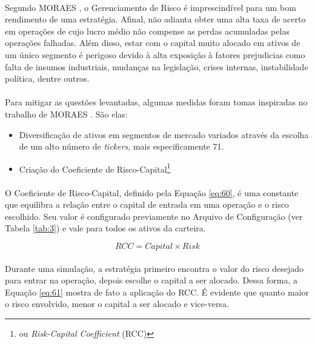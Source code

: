 \paragraph{} Segundo MORAES \cite{moraes2007se}, o Gerenciamento de Risco é imprescindível para um bom rendimento de uma estratégia. Afinal, não adianta obter uma alta taxa de acerto em operações de cujo lucro médio não compense as perdas acumuladas pelas operações falhadas. Além disso, estar com o capital muito alocado em ativos de um único segmento é perigoso devido à alta exposição à fatores prejudicias como falta de insumos industriais, mudanças na legislação, crises internas, instabilidade política, dentre outros.

\paragraph{} Para mitigar as questões levantadas, algumas medidas foram tomas inspiradas no trabalho de MORAES \cite{moraes2007se}. São elas:

\begin{itemize}
    \item Diversificação de ativos em segmentos de mercado variados através da escolha de um alto número de \textit{tickers}, mais especificamente 71.
    \item Criação do Coeficiente de Risco-Capital\footnote{ou \textit{Risk-Capital Coefficient} (RCC)}
\end{itemize}

\paragraph{} O Coeficiente de Risco-Capital, definido pela Equação \ref{eq:60}, é uma constante que equilibra a relação entre o capital de entrada em uma operação e o risco escolhido. Seu valor é configurado previamente no Arquivo de Configuração (ver Tabela \ref{tab:3}) e vale para todos os ativos da carteira.

\begin{equation} \label{eq:60}
    RCC = Capital \times Risk
\end{equation}

\paragraph{} Durante uma simulação, a estratégia primeiro encontra o valor do risco desejado para entrar na operação, depois escolhe o capital a ser alocado. Dessa forma, a Equação \ref{eq:61} mostra de fato a aplicação do RCC. É evidente que quanto maior o risco envolvido, menor o capital a ser alocado e vice-versa.

